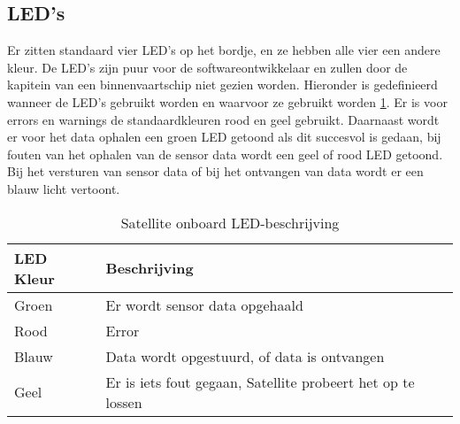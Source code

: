 \subsection{LED's}
Er zitten standaard vier LED’s op het bordje, en ze hebben alle vier een andere kleur. De LED’s zijn puur voor de softwareontwikkelaar en zullen door de kapitein van een binnenvaartschip niet gezien worden. Hieronder is gedefinieerd wanneer de LED’s gebruikt worden en waarvoor ze gebruikt worden \ref{tab:leds}. Er is voor errors en warnings de standaardkleuren rood en geel gebruikt. Daarnaast wordt er voor het data ophalen een groen LED getoond als dit succesvol is gedaan, bij fouten van het ophalen van de sensor data wordt een geel of rood LED getoond. Bij het versturen van sensor data of bij het ontvangen van data wordt er een blauw licht vertoont.
\begin{table}[h!]
	\caption{Satellite onboard LED-beschrijving}
	\begin{tabular}{lp{14.5cm}}
	\toprule
	\textbf{LED Kleur} 	& \textbf{Beschrijving} \\ \toprule
	Groen	& Er wordt sensor data opgehaald\\
	Rood	& Error \\
	Blauw	& Data wordt opgestuurd, of data is ontvangen \\
	Geel	& Er is iets fout gegaan, Satellite probeert het op te lossen\\  \bottomrule
	\end{tabular}
	\label{tab:leds}
\end{table}